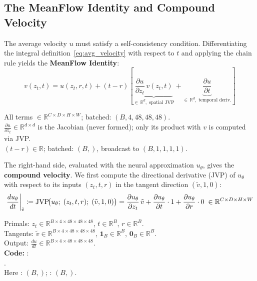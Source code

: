 \subsection{The MeanFlow Identity and Compound Velocity}
\label{sec:compound_v}

The average velocity $u$ must satisfy a self-consistency condition.
Differentiating the integral definition~\eqref{eq:avg_velocity} with respect
to $t$ and applying the chain rule yields the \textbf{MeanFlow Identity}:
\begin{equation}
  v(z_t,t)
    = u(z_t,r,t)
      + (t-r)\!\left[
          \underbrace{\frac{\partial u}{\partial z_t}\,v(z_t,t)}_{
            \in\,\mathbb{R}^{d},\;\text{spatial JVP}}
          + \underbrace{\frac{\partial u}{\partial t}}_{
            \in\,\mathbb{R}^{d},\;\text{temporal deriv.}}
        \right]
  \label{eq:mf_identity}
\end{equation}
\begin{shapes}
All terms $\in \mathbb{R}^{C \times D \times H \times W}$; batched: $(B, 4, 48, 48, 48)$.\\
$\frac{\partial u}{\partial z_t} \in \mathbb{R}^{d \times d}$ is the Jacobian
(never formed); only its product with $v$ is computed via JVP.\\
$(t-r) \in \mathbb{R}$; batched: $(B,)$, broadcast to $(B,1,1,1,1)$.
\end{shapes}

\noindent
The right-hand side, evaluated with the neural approximation $u_\theta$, gives
the \textbf{compound velocity}.  We first compute the directional derivative
(JVP) of $u_\theta$ with respect to its inputs $(z_t, t, r)$ in the tangent
direction $(\tilde{v}, 1, 0)$:
\begin{equation}
  \frac{du_\theta}{dt}\bigg|_{\tilde{v}}
    \coloneqq \mathrm{JVP}\!\bigl(u_\theta;\;(z_t,t,r);\;(\tilde{v},1,0)\bigr)
    = \frac{\partial u_\theta}{\partial z_t}\,\tilde{v}
      + \frac{\partial u_\theta}{\partial t}\cdot 1
      + \frac{\partial u_\theta}{\partial r}\cdot 0
    \;\in \mathbb{R}^{C \times D \times H \times W}
  \label{eq:jvp_def}
\end{equation}
\begin{shapes}
Primals: $z_t \in \mathbb{R}^{B \times 4 \times 48 \times 48 \times 48}$,
$t \in \mathbb{R}^{B}$, $r \in \mathbb{R}^{B}$.\\
Tangents: $\tilde{v} \in \mathbb{R}^{B \times 4 \times 48 \times 48 \times 48}$,
$\mathbf{1}_B \in \mathbb{R}^{B}$, $\mathbf{0}_B \in \mathbb{R}^{B}$.\\
Output: $\frac{du}{dt} \in \mathbb{R}^{B \times 4 \times 48 \times 48 \times 48}$.\\
\textbf{Code:} : \\
.\\
Here : $(B,)$; : $(B,)$.
\end{shapes}

